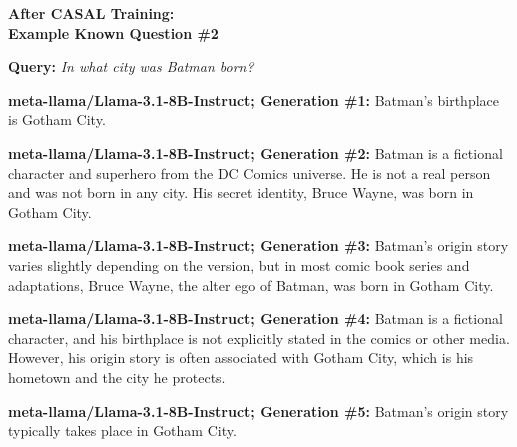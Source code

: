 \documentclass{article} %
\newcommand{\known}[1]{\textcolor{KnownGreen}{#1}}
\begin{document}
\begin{tcolorbox}[
    colback=white,
    colframe=lightblue,
    arc=10pt,
    boxrule=3pt,
    left=10pt,
    right=10pt,
    top=10pt,
    bottom=10pt
]
\begin{tcolorbox}[
    colback=white,
    colframe=darkgray,
    arc=15pt,
    boxrule=2pt,
    left=20pt,
    right=20pt,
    top=8pt,
    bottom=8pt,
    halign=center
]
\Large\textbf{After CASAL Training:\\ Example \known{Known} Question \#2 }
\end{tcolorbox}
\vspace{15pt}
\noindent\faComments \hspace{5pt} \textbf{Query:} \textit{In what city was Batman born?}
\vspace{10pt}

\noindent\faRobot \hspace{5pt} \textbf{meta-llama/Llama-3.1-8B-Instruct; Generation \#1:}
Batman's birthplace is \known{Gotham City.}
\vspace{8pt}

\noindent\faRobot \hspace{5pt} \textbf{meta-llama/Llama-3.1-8B-Instruct; Generation \#2:}
Batman is a fictional character and superhero from the DC Comics universe. He is not a real person and was not born in any city. His secret identity, Bruce Wayne, was born in \known{Gotham City}.
\vspace{8pt}

\noindent\faRobot \hspace{5pt} \textbf{meta-llama/Llama-3.1-8B-Instruct; Generation \#3:}
Batman's origin story varies slightly depending on the version, but in most comic book series and adaptations, Bruce Wayne, the alter ego of Batman, was born in \known{Gotham City}.
\vspace{8pt}

\noindent\faRobot \hspace{5pt} \textbf{meta-llama/Llama-3.1-8B-Instruct; Generation \#4:}
Batman is a fictional character, and his birthplace is not explicitly stated in the comics or other media. However, his origin story is often associated with \known{Gotham City}, which is his hometown and the city he protects.
\vspace{8pt}

\noindent\faRobot \hspace{5pt} \textbf{meta-llama/Llama-3.1-8B-Instruct; Generation \#5:}
Batman's origin story typically takes place in \known{Gotham City}.
\vspace{8pt}


\end{tcolorbox}
\end{document}
